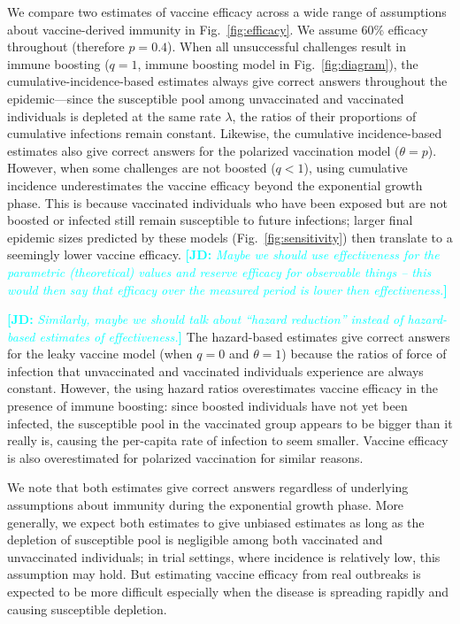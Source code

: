 \documentclass[12pt]{article}
\newcommand{\comment}{\showcomment}
\newcommand{\showcomment}[3]{\textcolor{#1}{\textbf{[#2: }\textsl{#3}\textbf{]}}}
\newcommand{\jd}[1]{\comment{cyan}{JD}{#1}}
\newcommand{\fref}[1]{Fig.~\ref{fig:#1}}
\begin{document}
We compare two estimates of vaccine efficacy across a wide range of assumptions about vaccine-derived immunity in \fref{efficacy}.
We assume 60\% efficacy throughout (therefore $p = 0.4$).
When all unsuccessful challenges result in immune boosting ($q=1$, immune boosting model in \fref{diagram}), the cumulative-incidence-based estimates always give correct answers throughout the epidemic---since the susceptible pool among unvaccinated and vaccinated individuals is depleted at the same rate $\lambda$, the ratios of their proportions of cumulative infections remain constant.
Likewise, the cumulative incidence-based estimates also give correct answers for the polarized vaccination model ($\theta = p$).
However, when some challenges are not boosted ($q < 1$), using cumulative incidence underestimates the vaccine efficacy beyond the exponential growth phase.
This is because vaccinated individuals who have been exposed but are not boosted or infected still remain susceptible to future infections; 
larger final epidemic sizes predicted by these models (\fref{sensitivity}) then translate to a seemingly lower vaccine efficacy.
\jd{Maybe we should use effectiveness for the parametric (theoretical) values and reserve efficacy for observable things -- this would then say that efficacy over the measured period is lower then effectiveness.}

\jd{Similarly, maybe we should talk about “hazard reduction” instead of hazard-based estimates of effectiveness.}
The hazard-based estimates give correct answers for the leaky vaccine model (when $q=0$ and $\theta=1$) because the ratios of force of infection that unvaccinated and vaccinated individuals experience are always constant.
However, the using hazard ratios overestimates vaccine efficacy in the presence of immune boosting: since boosted individuals have not yet been infected, the susceptible pool in the vaccinated group appears to be bigger than it really is, causing the per-capita rate of infection to seem smaller.
Vaccine efficacy is also overestimated for polarized vaccination for similar reasons.

We note that both estimates give correct answers regardless of underlying assumptions about immunity during the exponential growth phase.
More generally, we expect both estimates to give unbiased estimates as long as the depletion of susceptible pool is negligible among both vaccinated and unvaccinated individuals;
in trial settings, where incidence is relatively low, this assumption may hold.
But estimating vaccine efficacy from real outbreaks is expected to be more difficult especially when the disease is spreading rapidly and causing susceptible depletion.
\end{document}
